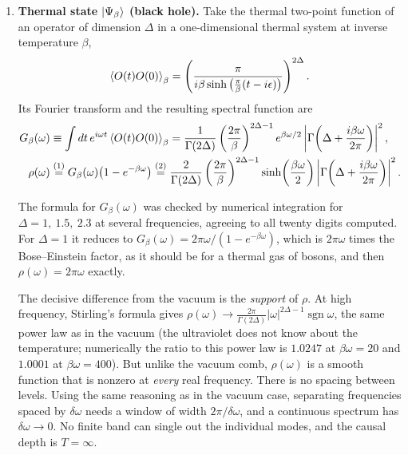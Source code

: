 \begin{enumerate}
\item \textbf{Thermal state $\ket{\Psi_\beta}$ (black hole).}
Take the thermal two-point function of an operator of dimension $\Delta$ in a one-dimensional thermal
system at inverse temperature $\beta$,
\[
\braket{O(t)O(0)}_\beta = \left(\frac{\pi}{i\beta \sinh\big(\frac{\pi}{\beta}(t - i\epsilon)\big)}\right)^{2\Delta} .
\]
Its Fourier transform and the resulting spectral function are
\begin{align}
G_\beta(\omega) &\equiv \int dt\, e^{i\omega t}\braket{O(t)O(0)}_\beta
= \frac{1}{\Gamma(2\Delta)}\left(\frac{2\pi}{\beta}\right)^{2\Delta-1} e^{\beta\omega/2}
\left|\Gamma\!\left(\Delta+\frac{i\beta\omega}{2\pi}\right)\right|^2 , \notag\\
\rho(\omega) &\overset{(1)}{=} G_\beta(\omega)\big(1-e^{-\beta\omega}\big)
\overset{(2)}{=} \frac{2}{\Gamma(2\Delta)}\left(\frac{2\pi}{\beta}\right)^{2\Delta-1}
\sinh\!\left(\frac{\beta\omega}{2}\right)\left|\Gamma\!\left(\Delta+\frac{i\beta\omega}{2\pi}\right)\right|^2 .
\label{eq:rho_thermal}
\end{align}
\quad
{}

The formula for $G_\beta(\omega)$ was checked by numerical integration for $\Delta=1,\ 1.5,\ 2.3$ at several
frequencies, agreeing to all twenty digits computed. For $\Delta=1$ it reduces to
$G_\beta(\omega)=2\pi\omega/(1-e^{-\beta\omega})$, which is $2\pi\omega$ times the Bose--Einstein factor, as it
should be for a thermal gas of bosons, and then $\rho(\omega)=2\pi\omega$ exactly.

The decisive difference from the vacuum is the \emph{support} of $\rho$. At high frequency, Stirling's formula
gives $\rho(\omega)\to\frac{2\pi}{\Gamma(2\Delta)}|\omega|^{2\Delta-1}\operatorname{sgn}\omega$, the same power
law as in the vacuum (the ultraviolet does not know about the temperature; numerically the ratio to this
power law is $1.0247$ at $\beta\omega=20$ and $1.0001$ at $\beta\omega=400$). But unlike the vacuum comb,
$\rho(\omega)$ is a smooth function that is nonzero at \emph{every} real frequency. There is no spacing between
levels. Using the same reasoning as in the vacuum case, separating frequencies spaced by $\delta\omega$ needs a
window of width $2\pi/\delta\omega$, and a continuous spectrum has $\delta\omega\to0$. No finite band can
single out the individual modes, and the causal depth is $T=\infty$.
\end{enumerate}

